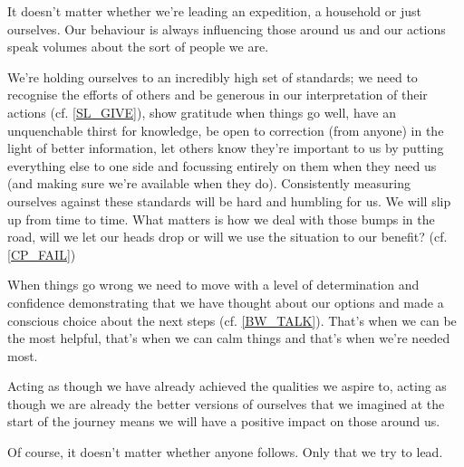 \cleardoublepage
\begin{multicols}{2}

It doesn't matter whether we're leading an expedition, a household or just ourselves. Our behaviour is always influencing those around us and our actions speak volumes about the sort of people we are.

We're holding ourselves to an incredibly high set of standards; we need to recognise the efforts of others and be generous in our interpretation of their actions (cf. \ref{SL_GIVE}), show gratitude when things go well, have an unquenchable thirst for knowledge, be open to correction (from anyone) in the light of better information, let others know they're important to us by putting everything else to one side and focussing entirely on them when they need us (and making sure we're available when they do). Consistently measuring ourselves against these standards will be hard and humbling for us. We will slip up from time to time. What matters is how we deal with those bumps in the road, will we let our heads drop or will we use the situation to our benefit? (cf. \ref{CP_FAIL})

When things go wrong we need to move with a level of determination and confidence demonstrating that we have thought about our options and made a conscious choice about the next steps (cf. \ref{BW_TALK}). That's when we can be the most helpful, that's when we can calm things and that's when we're needed most.

Acting as though we have already achieved the qualities we aspire to, acting as though we are already the better versions of ourselves that we imagined at the start of the journey means we will have a positive impact on those around us.

Of course, it doesn't matter whether anyone follows. Only that we try to lead.

\end{multicols}
\clearpage
